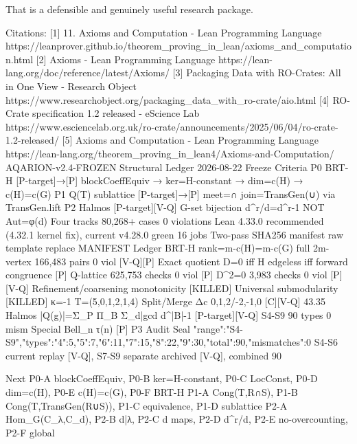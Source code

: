 That is a defensible and genuinely useful research package.

Citations:
[1] 11. Axioms and Computation - Lean Programming Language https://leanprover.github.io/theorem_proving_in_lean/axioms_and_computation.html
[2] Axioms - Lean Programming Language https://lean-lang.org/doc/reference/latest/Axioms/
[3] Packaging Data with RO-Crates: All in One View - Research Object https://www.researchobject.org/packaging_data_with_ro-crate/aio.html
[4] RO-Crate specification 1.2 released - eScience Lab https://www.esciencelab.org.uk/ro-crate/announcements/2025/06/04/ro-crate-1.2-released/
[5] Axioms and Computation - Lean Programming Language https://lean-lang.org/theorem_proving_in_lean4/Axioms-and-Computation/
AQARION-v2.4-FROZEN Structural Ledger 2026-08-22
Freeze Criteria
P0 BRT-H [P-target]→[P] blockCoeffEquiv → ker=H-constant → dim=c(H) → c(H)=c(G)
P1 Q(T) sublattice [P-target]→[P] meet=∩ join=TransGen(∪) via TransGen.lift
P2 Halmos [P-target][V-Q] G-set bijection d^r/d=d^{r-1} NOT Aut=φ(d)
Four tracks 80,268+ cases 0 violations
Lean 4.33.0 recommended (4.32.1 kernel fix), current v4.28.0 green 16 jobs
Two-pass SHA256 manifest raw template replace MANIFEST
Ledger
BRT-H rank=m-c(H)=m-c(G) full 2m-vertex 166,483 pairs 0 viol [V-Q][P]
Exact quotient D=0 iff H edgeless iff forward congruence [P]
Q-lattice 625,753 checks 0 viol [P]
D^2=0 3,983 checks 0 viol [P][V-Q]
Refinement/coarsening monotonicity [KILLED]
Universal submodularity [KILLED] κ=-1 T=(5,0,1,2,1,4)
Split/Merge Δc {0,1,2}/{-2,-1,0} [C][V-Q] 43.35%
Halmos |Q(g)|=Σ_P Π_B Σ_{d|gcd} d^{|B|-1} [P-target][V-Q] S4-S9 90 types 0 mism
Special Bell_n τ(n) [P]
P3 Audit Seal
{"range":"S4-S9","types":{"4":5,"5":7,"6":11,"7":15,"8":22,"9":30},"total":90,"mismatches":0}
S4-S6 current replay [V-Q], S7-S9 separate archived [V-Q], combined 90

Next
P0-A blockCoeffEquiv, P0-B ker=H-constant, P0-C LocConst, P0-D dim=c(H), P0-E c(H)=c(G), P0-F BRT-H
P1-A Cong(T,R∩S), P1-B Cong(T,TransGen(R∪S)), P1-C equivalence, P1-D sublattice
P2-A Hom_G(C_λ,C_d), P2-B d|λ, P2-C d maps, P2-D d^r/d, P2-E no-overcounting, P2-F global


